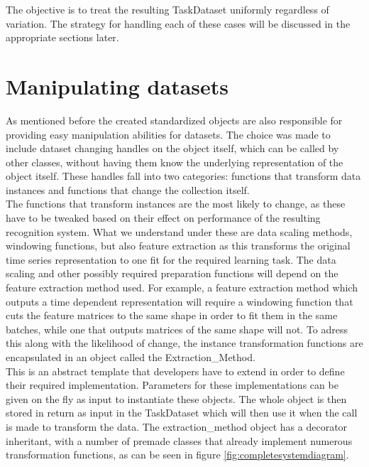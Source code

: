 The objective is to treat the resulting TaskDataset uniformly regardless of variation. The strategy for handling each of these cases will be discussed in the appropriate sections later. \\


\section{Manipulating datasets} \label{Design:Manipulating}

As mentioned before the created standardized objects are also responsible for providing easy manipulation abilities for datasets. The choice was made to include dataset changing handles on the object itself, which can be called by other classes, without having them know the underlying representation of the object itself. These handles fall into two categories: functions that transform data instances and functions that change the collection itself. \\

The functions that transform instances are the most likely to change, as these have to be tweaked based on their effect on performance of the resulting recognition system. What we understand under these are data scaling methods, windowing functions, but also feature extraction as this transforms the original time series representation to one fit for the required learning task. The data scaling and other possibly required preparation functions will depend on the feature extraction method used. For example, a feature extraction method which outputs a time dependent representation will require a windowing function that cuts the feature matrices to the same shape in order to fit them in the same batches, while one that outputs matrices of the same shape will not. To adress this along with the likelihood of change, the instance transformation functions are encapsulated in an object called the Extraction\_Method. \\

This is an abstract template that developers have to extend in order to define their required implementation. Parameters for these implementations can be given on the fly as input to instantiate these objects. The whole object is then stored in return as input in the TaskDataset which will then use it when the call is made to transform the data. The extraction\_method object has a decorator inheritant, with a number of premade classes that already implement numerous transformation functions, as can be seen in figure \ref{fig:completesystemdiagram}.\\

